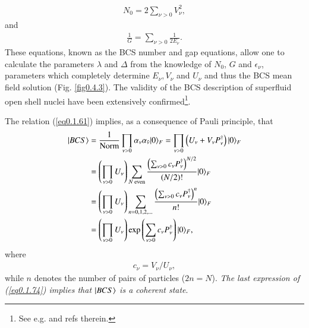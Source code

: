 \begin{align}\label{eq0.1.72}
N_0=2\sum_{\nu>0}V^2_\nu,
\end{align}
 and 
\begin{align}\label{eq0.1.73}
\frac{1}{G}=\sum_{\nu>0}\frac{1}{2E_\nu}.
\end{align}
These equations, known as the BCS number and gap equations, allow one to calculate the parameters $\lambda$ and $\Delta$ from the knowledge of $N_0$, $G$ and $\epsilon_\nu$, parameters which completely determine $E_\nu,V_\nu$ and $U_\nu$ and thus the BCS mean field solution (Fig. \ref{fig0.4.3}). The validity of the BCS description of superfluid open shell nuclei have been extensively confirmed\footnote{See e.g. \cite{Broglia:13} and refs therein.}. 

 The relation (\ref{eq0.1.61}) implies, as a consequence of Pauli principle, that 
\begin{align}\label{eq0.1.74}
\nonumber |{BCS} \rangle&=\frac{1}{\text{Norm}}\prod_{\nu>0}\alpha_\nu\alpha_{\tilde\nu}|{0} \rangle_F=\prod_{\nu>0}\left(U_\nu+V_\nu P^\dagger_\nu\right)|{0} \rangle_F\\
\nonumber&=\left(\prod_{\nu>0}U_{\nu}\right)\sum_{N\text{ even}} \frac{\left(\sum_{\nu>0}c_\nu P_\nu^\dagger\right)^{N/2}}{(N/2)!}|{0} \rangle_F\\
\nonumber&=\left(\prod_{\nu>0}U_\nu\right)\sum_{n=0,1,2,\dots}\frac{\left(\sum_{\nu>0}c_\nu P^\dagger_\nu\right)^n}{n!}|{0} \rangle_F\\
&=\left(\prod_{\nu>0}U_\nu\right)\exp\left(\sum_{\nu>0}c_\nu P^\dagger_\nu\right)|{0} \rangle_F,
\end{align}
 where
\begin{align}\label{eq0.1.75}
c_\nu=V_\nu/U_\nu,
\end{align}
while $n$ denotes the number of pairs of particles ($2n=N$). \textit{The last expression of (\ref{eq0.1.74}) implies that $|{BCS} \rangle$ is a coherent state}.




